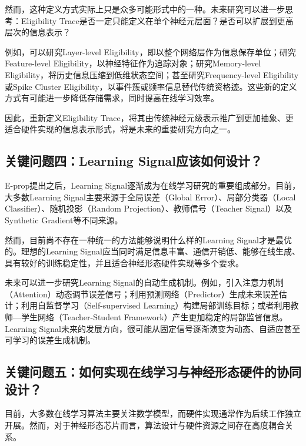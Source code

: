 \documentclass[11pt]{ctexart}
\begin{document}
然而，这种定义方式实际上只是众多可能形式中的一种。未来研究可以进一步思考：Eligibility Trace是否一定只能定义在单个神经元层面？是否可以扩展到更高层次的信息表示？

例如，可以研究Layer-level Eligibility，即以整个网络层作为信息保存单位；研究Feature-level Eligibility，以神经特征作为追踪对象；研究Memory-level Eligibility，将历史信息压缩到低维状态空间；甚至研究Frequency-level Eligibility或Spike Cluster Eligibility，以事件簇或频率信息替代传统资格迹。这些新的定义方式有可能进一步降低存储需求，同时提高在线学习效率。

因此，重新定义Eligibility Trace，将其由传统神经元级表示推广到更加抽象、更适合硬件实现的信息表示形式，将是未来的重要研究方向之一。


\subsection{关键问题四：Learning Signal应该如何设计？}

E-prop提出之后，Learning Signal逐渐成为在线学习研究的重要组成部分。目前，大多数Learning Signal主要来源于全局误差（Global Error）、局部分类器（Local Classifier）、随机投影（Random Projection）、教师信号（Teacher Signal）以及Synthetic Gradient等不同来源。

然而，目前尚不存在一种统一的方法能够说明什么样的Learning Signal才是最优的。理想的Learning Signal应当同时满足信息丰富、通信开销低、能够在线生成、具有较好的训练稳定性，并且适合神经形态硬件实现等多个要求。

未来可以进一步研究Learning Signal的自动生成机制。例如，引入注意力机制（Attention）动态调节误差信号；利用预测网络（Predictor）生成未来误差估计；利用自监督学习（Self-supervised Learning）构建局部训练目标；或者利用教师—学生网络（Teacher-Student Framework）产生更加稳定的局部监督信息。Learning Signal未来的发展方向，很可能从固定信号逐渐演变为动态、自适应甚至可学习的误差生成机制。


\subsection{关键问题五：如何实现在线学习与神经形态硬件的协同设计？}

目前，大多数在线学习算法主要关注数学模型，而硬件实现通常作为后续工作独立开展。然而，对于神经形态芯片而言，算法设计与硬件资源之间存在高度耦合关系。
\end{document}
